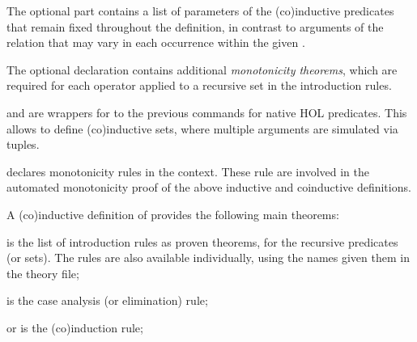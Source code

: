\begin{isabellebody}
\begin{isamarkuptext}
\begin{description}
  The optional \hyperlink{keyword.for}{\mbox{}} part contains a list of parameters of
  the (co)inductive predicates that remain fixed throughout the
  definition, in contrast to arguments of the relation that may vary
  in each occurrence within the given .

  The optional \hyperlink{keyword.monos}{\mbox{}} declaration contains additional
  \emph{monotonicity theorems}, which are required for each operator
  applied to a recursive set in the introduction rules.

  \item \hyperlink{command.HOL.inductive-set}{\mbox{}} and \hyperlink{command.HOL.coinductive-set}{\mbox{}} are wrappers for to the previous commands for
  native HOL predicates.  This allows to define (co)inductive sets,
  where multiple arguments are simulated via tuples.

  \item \hyperlink{attribute.HOL.mono}{\mbox{}} declares monotonicity rules in the
  context.  These rule are involved in the automated monotonicity
  proof of the above inductive and coinductive definitions.

  \end{description}%
\end{isamarkuptext}%
\isamarkuptrue%
%
\isamarkuptrue%
%
\begin{isamarkuptext}%
A (co)inductive definition of  provides the following
  main theorems:

  \begin{description}

  \item {} is the list of introduction rules as proven
  theorems, for the recursive predicates (or sets).  The rules are
  also available individually, using the names given them in the
  theory file;

  \item {} is the case analysis (or elimination) rule;

  \item {} or  is the (co)induction
  rule;


\end{description}
\end{isamarkuptext}
\end{isabellebody}
